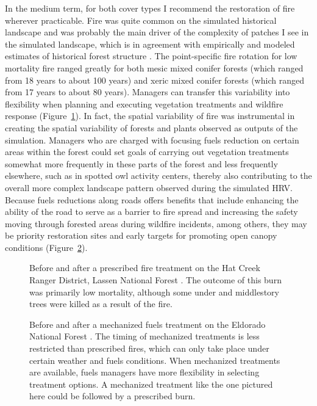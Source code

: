 In the medium term, for both cover types I recommend the restoration of fire wherever practicable. Fire was quite common on the simulated historical landscape and was probably the main driver of the complexity of patches I see in the simulated landscape, which is in agreement with empirically and modeled estimates of historical forest structure \citep{Franklin2002,Nonaka2005,Mallek2013}. The point-specific fire rotation for low mortality fire ranged greatly for both mesic mixed conifer forests (which ranged from 18 years to about 100 years) and xeric mixed conifer forests (which ranged from 17 years to about 80 years). Managers can transfer this variability into flexibility when planning and executing vegetation treatments and wildfire response (Figure~\ref{fig:pfire_comp_HCRD}). In fact, the spatial variability of fire was instrumental in creating the spatial variability of forests and plants observed as outputs of the simulation. Managers who are charged with focusing fuels reduction on certain areas within the forest could set goals of carrying out vegetation treatments somewhat more frequently in these parts of the forest and less frequently elsewhere, such as in spotted owl activity centers, thereby also contributing to the overall more complex landscape pattern observed during the simulated HRV. Because fuels reductions along roads offers benefits that include enhancing the ability of the road to serve as a barrier to fire spread and increasing the safety moving through forested areas during wildfire incidents, among others, they may be priority restoration sites and early targets for promoting open canopy conditions (Figure~\ref{fig:pfire_comp_EDNF}). 

\begin{figure}[!htbp]
  \centering
  \caption{Before and after a prescribed fire treatment on the Hat Creek Ranger District, Lassen National Forest \citep{SNAMNphoto}. The outcome of this burn was primarily low mortality, although some under and middlestory trees were killed as a result of the fire.} 
  \label{fig:pfire_comp_HCRD}
\end{figure}

\begin{figure}[!htbp]
  \centering
  \caption{Before and after a mechanized fuels treatment on the Eldorado National Forest \citep{Winford2015}. The timing of mechanized treatments is less restricted than prescribed fires, which can only take place under certain weather and fuels conditions. When mechanized treatments are available, fuels managers have more flexibility in selecting treatment options. A mechanized treatment like the one pictured here could be followed by a prescribed burn.} 
  \label{fig:pfire_comp_EDNF}
\end{figure}


